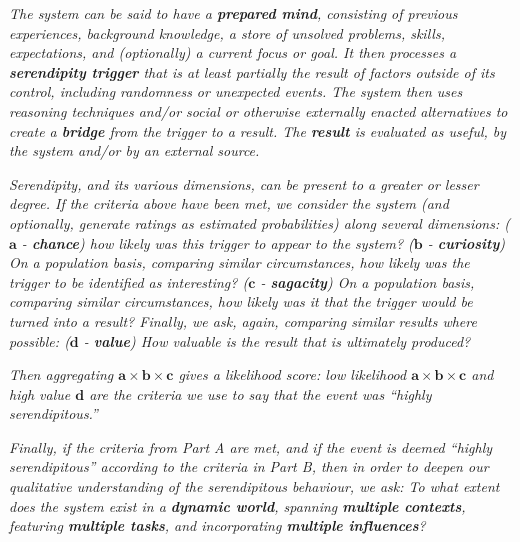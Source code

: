 \begin{description}[itemsep=4pt]
\item[\emph{(\textbf{A - Definitional characteristics})}] \emph{The
  system can be said to have a \emph{\textbf{prepared mind}},
  consisting of previous experiences, background knowledge, a store of
  unsolved problems, skills, expectations, and (optionally) a current
  focus or goal.  It then processes a \emph{\textbf{serendipity
  trigger}} that is at least partially the result of factors outside
  of its control, including randomness or unexpected events.  The
  system then uses reasoning techniques and/or social or otherwise
  externally enacted alternatives to create a \emph{\textbf{bridge}}
  from the trigger to a result.  The \emph{\textbf{result}} is
  evaluated as useful, by the system and/or by an external source.}
\item[\emph{(\textbf{B - Dimensions})}] \emph{Serendipity, and its
  various dimensions, can be present to a greater or lesser degree.
  If the criteria above have been met, we consider the system (and optionally, generate ratings as
  estimated probabilities) along several dimensions:
%
\emph{($\mathbf{a}$ - \textbf{chance})} how likely was this trigger to appear to
  the system?
%
\emph{($\mathbf{b}$ - \textbf{curiosity})} On a population basis, comparing
  similar circumstances, how likely was the trigger to be identified
  as interesting?
%
\emph{($\mathbf{c}$ - \textbf{sagacity})} On a population basis, comparing
  similar circumstances, how likely was it that the trigger
  would be turned into a result?
%
Finally, we ask, again, comparing similar results where possible:
\emph{($\mathbf{d}$ - \textbf{value})} How valuable is the result that
is ultimately produced?}

\medskip

\emph{Then aggregating $\mathbf{a}\times\mathbf{b}\times\mathbf{c}$ gives a
  likelihood score: low likelihood $\mathbf{a}\times\mathbf{b}\times\mathbf{c}$ and high value $\mathbf{d}$ are the criteria we use to say that the event was ``highly serendipitous.''}

\item[\emph{(\textbf{C - Factors})}] \emph{Finally, if the criteria
  from Part A are met, and if the event is deemed ``highly
  serendipitous'' according to the criteria in Part B, then in order
  to deepen our qualitative understanding of the serendipitous
  behaviour, we ask: To what extent does the system exist in a
  \emph{\textbf{dynamic world}}, spanning \emph{\textbf{multiple
      contexts}}, featuring \emph{\textbf{multiple tasks}}, and
  incorporating \emph{\textbf{multiple influences}}?}
\end{description}

